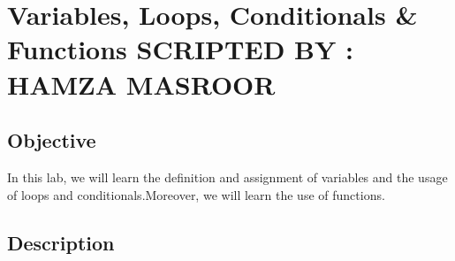 \documentclass[11pt,fleqn]{book} %
\begin{document}


\pagestyle{empty} %

\tableofcontents %

\cleardoublepage %

\chapter{Variables, Loops, Conditionals \& Functions {\textsc{\small SCRIPTED BY : HAMZA MASROOR}}}

\section{Objective}
In this lab, we will learn the definition and assignment of variables and the usage of loops and conditionals.Moreover, we will learn the use of functions.
\section{Description} 
\end{document}
